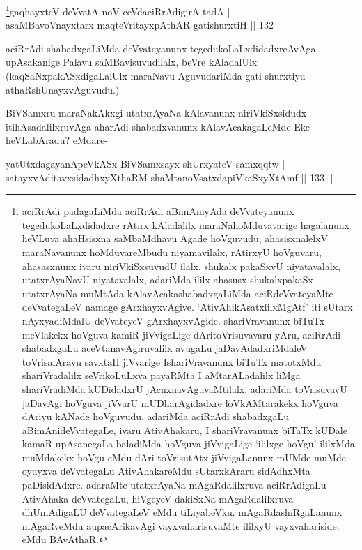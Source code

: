 \begin{shl}
\footnote{aciRrAdi padagaLiMda aciRrAdi aBimAniyAda deVvateyanunx  tegedukoLaLxdidadxre rAtirx kAladalilx maraNahoMduvavarige  hagalanunx heVLuva ahaHsisxna saMbaMdhavu Agade hoVguvudu,  ahasisxnalelxV maraNavanunx hoMduvareMbudu niyamavilalx, rAtirxyU  hoVguvaru, ahasasxnunx ivaru niriVkiSxsuvudU ilalx, shukalx pakaSxvU  niyatavalalx, utatxrAyaNavU niyatavalalx, adariMda ililx ahasusx  shukalxpakaSx utatxrAyaNa muMtAda kAlavAcakashabadxgaLiMda  aciRdeVvateyaMte deVvategaLeV namage  gArxhayxvAgive. `AtivAhikAsatxlilxMgAtf' iti sUtarx nAyxyadiMdalU  deVvateyeV gArxhayxvAgide. shariVravanunx biTuTx meVlakekx hoVguva  kamiR jiVvigaLige dAritoVrisuvavaru yAru, aciRrAdi shabadxgaLu  aceVtanavAgiruvalilx avugaLu jaDavAdadxriMdaleV toVrisalAravu savxtaH  jiVvarige IshariVravanunx biTuTx matotxMdu shariVradalilx  seVrikoLuLxva payaRMta I aMtarALadalilx liMga shariVradiMda  kUDidadxrU jAcnxnavAguvaMtilalx, adariMda toVrisuvavU jaDavAgi  hoVguva jiVvarU mUDharAgidadxre loVkAMtarakekx hoVguva dAriyu kANade  hoVguvudu, adariMda aciRrAdi shabadxgaLu aBimAnideVvategaLe, ivaru  AtivAhakaru, I shariVravanunx biTaTx kUDale kamaR upAsanegaLa  baladiMda hoVguva jiVvigaLige `ililxge hoVgu' ililxMda muMdakekx  hoVgu eMdu dAri toVrisutAtx jiVvigaLanunx mUMde muMde oyuyxva  deVvategaLu AtivAhakareMdu sUtarxkAraru sidAdhxMta  paDisidAdxre. adaraMte utatxrAyaNa mAgaRdalilxruva aciRrAdigaLu  AtivAhaka deVvategaLu, hiVgeyeV dakiSxNa mAgaRdalilxruva dhUmAdigaLU  deVvategaLeV eMdu tiLiyabeVku. mAgaRdashiRgaLanunx mAgaRveMdu  aupacArikavAgi vayxvaharisuvaMte ililxyU vayxvahariside. eMdu  BAvAthaR.}gaqhayxteV deVvatA noV ceVdaciRrAdigirA tadA | \\
asaMBavoV\s nayxtarx maqteVritayxpAthAR gatishurxtiH \hfill|| 132 || 
\end{shl}

\begin{artha}
aciRrAdi shabadxgaLiMda deVvateyanunx tegedukoLaLxdidadxreAvAga upAsakanige Palavu saMBavisuvudilalx, beVre kAladalUlx (kaqSaNxpakASxdigaLalUlx maraNavu AguvudariMda gati shurxtiyu athaRshUnayxvAguvudu.)
\end{artha}

\begin{artha}
BiVSamxru maraNakAkxgi utatxrAyaNa kAlavanunx niriVkiSxsidudx
itihAsadalilxruvAga aharAdi shabadxvanunx kAlavAcakagaLeMde Eke heVLabAradu? eMdare-
\end{artha}

\begin{shl}
yatUtxdagayanApeVkASx BiVSamxsayx shUrxyateV samxqqtw | \\
satayxvAditavxsidadhxyXthaRM shaMtanoVsatxdapiVkaSxyXtAmf \hfill|| 133 || 
\end{shl}

